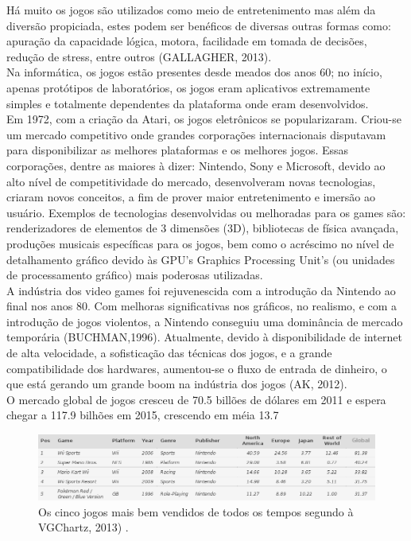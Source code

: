 \documentclass{article}
\begin{document}
Há muito os jogos são utilizados como meio de entretenimento mas além da diversão propiciada, estes podem ser benéficos de diversas outras formas como: apuração da capacidade lógica, motora, facilidade em tomada de decisões, redução de stress, entre outros (GALLAGHER, 2013). 
\\
	Na informática, os jogos estão presentes desde meados dos anos 60; no início, apenas protótipos de laboratórios, os jogos eram aplicativos extremamente simples e totalmente dependentes da plataforma onde eram desenvolvidos. 
\\
	Em 1972, com a criação da Atari, os jogos eletrônicos se popularizaram. Criou-se um mercado competitivo onde grandes corporações internacionais disputavam para disponibilizar as melhores plataformas e os melhores jogos.  Essas corporações, dentre as maiores à dizer: Nintendo, Sony e Microsoft, devido ao alto nível de competitividade do mercado, desenvolveram novas tecnologias, criaram novos conceitos, a fim de prover maior entretenimento e imersão ao usuário. Exemplos de tecnologias desenvolvidas ou melhoradas para os games são: renderizadores de elementos de 3 dimensões (3D), bibliotecas de física avançada, produções musicais específicas para os jogos, bem como o acréscimo no nível de detalhamento gráfico devido às GPU's Graphics Processing Unit's (ou unidades de processamento gráfico) mais poderosas utilizadas. 
\\
	A indústria dos video games foi rejuvenescida com a introdução da Nintendo ao final nos anos 80. Com melhoras significativas  nos gráficos, no realismo, e com a introdução de jogos violentos, a Nintendo conseguiu uma dominância de mercado temporária (BUCHMAN,1996).
	Atualmente, devido à disponibilidade de internet de alta velocidade, a sofisticação das técnicas dos jogos, e a grande compatibilidade dos hardwares, aumentou-se o fluxo de entrada de dinheiro, o que está gerando um grande boom na indústria dos jogos (AK, 2012).
\\
	O mercado global de jogos cresceu de 70.5 billões de dólares em 2011 e espera chegar a 117.9 bilhões em 2015, crescendo em méia 13.7%


\begin{figure}[!htbp]
    \begin{center}
        \includegraphics[width=\textwidth]{asset/img/bestSelledGames.jpg}
               \caption{Os cinco jogos mais bem vendidos de todos os tempos segundo à VGChartz, 2013) . \label{fig:Jogos mais bem vendidos}}
    \end{center}
\end{figure}
\end{document}
